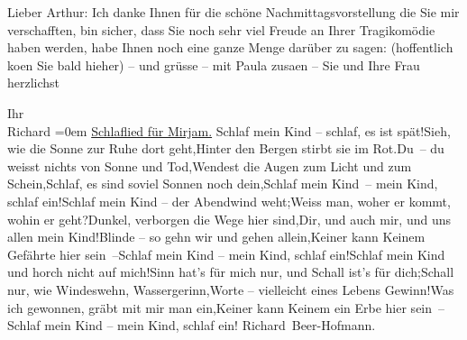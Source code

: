\pstart
           Lieber Arthur: Ich danke Ihnen für die schöne Nachmittagsvorstellung die Sie mir
               verschafften, bin sicher, dass Sie noch sehr viel Freude an Ihrer Tragikomödie haben werden, habe Ihnen noch
               eine ganze Menge darüber zu sagen: (hoffentlich ko{\geminationm}en
               Sie bald hieher) – und grüsse – mit Paula
                  zusa{\geminationm}en – Sie und Ihre Frau herzlichst\pend
           
\pstart
           Ihr{\\[\baselineskip]}\spacefill\mbox{Richard}\pend
           \leftskip=0em{}\vspace{1em}{\vspace{1\baselineskip}}
\pstart
           \centering{}{\pb}\uline{Schlaflied für Mirjam.}\pend
           {\vspace{1\baselineskip}}\stanza{}Schlaf mein Kind – schlaf, es ist spät!Sieh, wie die Sonne zur Ruhe dort geht,Hinter den Bergen stirbt sie im Rot.Du – du weisst nichts von Sonne und Tod,Wendest die Augen zum Licht und zum Schein,Schlaf, es sind soviel Sonnen noch dein,Schlaf mein Kind – mein Kind, schlaf ein!\stanzaend{}\stanza{}Schlaf mein Kind – der Abendwind weht;Weiss man, woher er kommt, wohin er geht?Dunkel, verborgen die Wege hier sind,Dir, und auch mir, und uns allen mein Kind!Blinde – so gehn wir und gehen allein,Keiner kann Keinem Gefährte hier sein –Schlaf mein Kind – mein Kind, schlaf ein!\stanzaend{}\stanza{}Schlaf mein Kind und horch nicht auf mich!Sinn hat’s für mich nur, und Schall ist’s für dich;Schall nur, wie Windeswehn, Wassergerinn,Worte – vielleicht eines Lebens Gewinn!Was ich gewonnen, gräbt mit mir man ein,Keiner kann Keinem ein Erbe hier sein –Schlaf mein Kind – mein Kind, schlaf ein!\stanzaend{}
\pstart
           \spacefill\mbox{Richard Beer-Hofmann.}\pend
           \endnumbering{}  
      